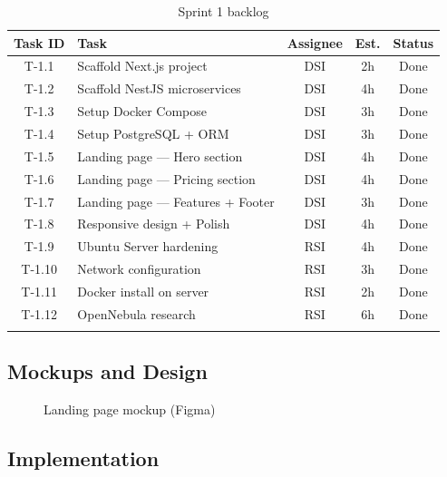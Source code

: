 \begin{longtable}{|c|p{5cm}|c|c|c|}
\hline
\rowcolor{blue!15}
\textbf{Task ID} & \textbf{Task} & \textbf{Assignee} & \textbf{Est.} & \textbf{Status} \\
\hline
\endhead
T-1.1 & Scaffold Next.js project & DSI & 2h & Done \\
\hline
T-1.2 & Scaffold NestJS microservices & DSI & 4h & Done \\
\hline
T-1.3 & Setup Docker Compose & DSI & 3h & Done \\
\hline
T-1.4 & Setup PostgreSQL + ORM & DSI & 3h & Done \\
\hline
T-1.5 & Landing page — Hero section & DSI & 4h & Done \\
\hline
T-1.6 & Landing page — Pricing section & DSI & 4h & Done \\
\hline
T-1.7 & Landing page — Features + Footer & DSI & 3h & Done \\
\hline
T-1.8 & Responsive design + Polish & DSI & 4h & Done \\
\hline
T-1.9 & Ubuntu Server hardening & RSI & 4h & Done \\
\hline
T-1.10 & Network configuration & RSI & 3h & Done \\
\hline
T-1.11 & Docker install on server & RSI & 2h & Done \\
\hline
T-1.12 & OpenNebula research & RSI & 6h & Done \\
\hline
\caption{Sprint 1 backlog}
\label{tab:sprint1-backlog}
\end{longtable}

\subsection{Mockups and Design}

\begin{figure}[H]
\centering
\caption{Landing page mockup (Figma)}
\label{fig:landing-mockup}
\end{figure}

\subsection{Implementation}

